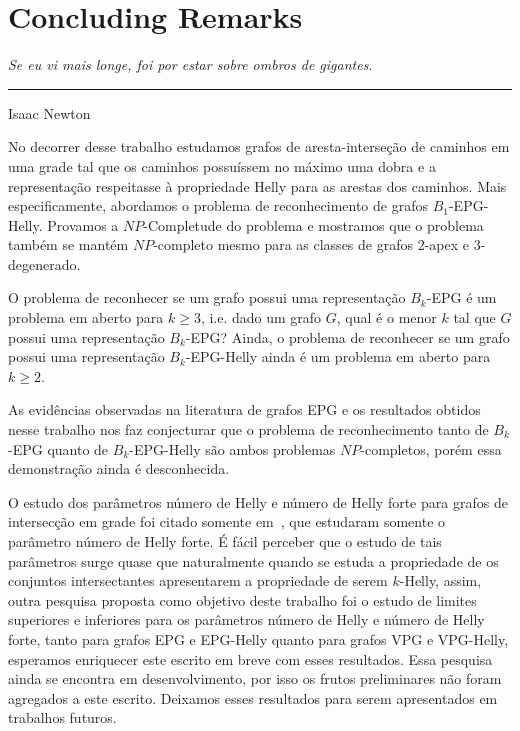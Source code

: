 \chapter{Concluding Remarks}\label{conclusao}

\begin{flushright}
\begin{minipage}[t][0cm][b]{0.47\textwidth}
\emph{
Se eu vi mais longe, foi por estar sobre ombros de gigantes.}
\end{minipage}

\rule[0cm]{7cm}{0.03cm}%

Isaac Newton
\end{flushright}



No decorrer desse trabalho estudamos grafos de aresta-interseção de caminhos em uma grade tal que os caminhos possuíssem no máximo uma dobra e a representação respeitasse à propriedade Helly para as arestas dos caminhos. Mais especificamente, abordamos o problema de reconhecimento de grafos $B_1$-EPG-Helly. Provamos a $NP$-Completude do problema e mostramos que o problema também se mantém $NP$-completo mesmo para as classes de grafos $2$-apex e $3$-degenerado.

O problema de reconhecer se um grafo possui uma representação $B_{k}$-EPG é um problema em aberto para $k\geq 3$, i.e. dado um grafo $G$, qual é o menor $k$ tal que $G$ possui uma representação $B_{k}$-EPG? Ainda, o problema de reconhecer se um grafo possui uma representação $B_{k}$-EPG-Helly ainda é um problema em aberto para $k\geq 2$.

As evidências observadas na literatura de grafos EPG e os resultados obtidos nesse trabalho nos faz conjecturar que o problema de reconhecimento tanto de $B_{k}$-EPG quanto de $B_{k}$-EPG-Helly são ambos problemas $NP$-completos, porém essa demonstração ainda é desconhecida.

O estudo dos parâmetros número de Helly e número de Helly forte para grafos de intersecção em grade foi citado somente em~\cite{golumbic2009, golumbic2013}, que estudaram somente o parâmetro número de Helly forte.
É fácil perceber que o estudo de tais parâmetros surge quase que naturalmente quando se estuda a propriedade de os conjuntos intersectantes apresentarem a propriedade de serem $k$-Helly, assim, outra pesquisa proposta como objetivo deste trabalho foi o estudo de limites superiores e inferiores para os parâmetros número de Helly e número de Helly forte, tanto para grafos EPG e EPG-Helly quanto para grafos VPG e VPG-Helly, esperamos enriquecer este escrito em breve com esses resultados. Essa pesquisa ainda se encontra em desenvolvimento, por isso os frutos preliminares não foram agregados a este escrito. Deixamos esses resultados para serem apresentados em trabalhos futuros.

